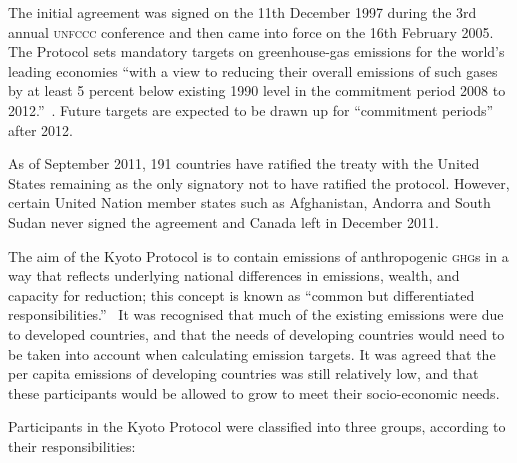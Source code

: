 The initial agreement was signed on the 11th December 1997 during the 3rd annual \textsc{unfccc} conference and then came into force on the 16th February 2005. The Protocol sets mandatory targets on greenhouse-gas emissions for the world's leading economies ``with a view to reducing their overall emissions of such gases by at least 5 percent below existing 1990 level in the commitment period 2008 to 2012.''~\cite{UNFCCC-98-p1}. Future targets are expected to be drawn up for ``commitment periods'' after 2012.~\cite{UNFCCC-98-p4}

As of September 2011, 191 countries have ratified the treaty with the United States remaining as the only signatory not to have ratified the protocol. However, certain United Nation member states such as Afghanistan, Andorra and South Sudan never signed the agreement and Canada left in December 2011.

The aim of the Kyoto Protocol is to contain emissions of anthropogenic \textsc{ghg}s in a way that reflects underlying national differences in emissions, wealth, and capacity for reduction; this concept is known as ``common but differentiated responsibilities.''~\cite{Grubb-04}\cite{UNFCCC-92} It was recognised that much of the existing \CO emissions were due to developed countries, and that the needs of developing countries would need to be taken into account when calculating emission targets. It was agreed that the per capita emissions of developing countries was still relatively low, and that these participants would be allowed to grow to meet their socio-economic needs.

Participants in the Kyoto Protocol were classified into three groups, according to their responsibilities:~\cite{UNFCCC-92}

